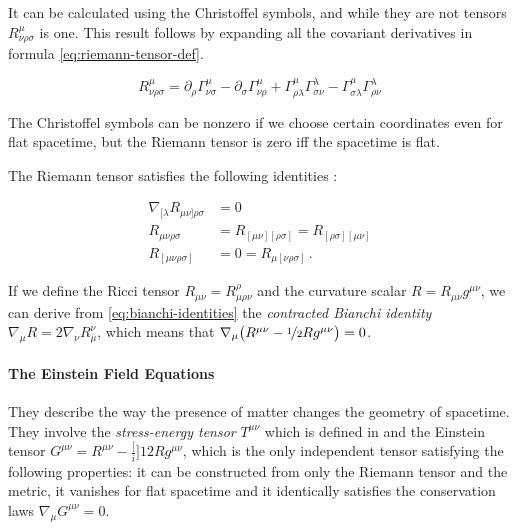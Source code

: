 \documentclass[main.tex]{subfiles}
\begin{document}
It can be calculated using the Christoffel symbols, and while they are not tensors \(R ^{\mu} _{\nu \rho \sigma}\) is one. This result follows by expanding all the covariant derivatives in formula \eqref{eq:riemann-tensor-def}.

\begin{equation}
    R ^{\mu} _{\nu \rho \sigma} =
     \partial_\rho \Gamma^\mu_{\nu \sigma}
    -\partial_\sigma \Gamma^\mu_{\nu \rho}
    +\Gamma^\mu_{\rho \lambda} \Gamma ^{\lambda} _{\sigma \nu}
    -\Gamma^\mu_{\sigma \lambda} \Gamma ^{\lambda} _{\rho \nu}
\end{equation}

The Christoffel symbols can be nonzero if we choose certain coordinates even for flat spacetime, but the Riemann tensor is zero iff the spacetime is flat.

The Riemann tensor satisfies the following identities \cite[eqs. 8.45 and 8.76]{MisnerThorneWheeler:1973}:

\vspace{-.5cm}

\begin{subequations}
\begin{align}
  \nabla _{[\lambda} R_{\mu\nu]\rho \sigma} &= 0 \label{eq:bianchi-identities}  \\
  R_{\mu\nu\rho\sigma} &= R_{[\mu\nu][\rho\sigma]} = R_{[\rho\sigma][\mu\nu]}  \\
  R_{[\mu\nu\rho\sigma]} &= 0 = R_{\mu[\nu\rho\sigma]} \,.
\end{align}
\end{subequations}

If we define the Ricci tensor \(R_{\mu\nu} = R^\rho_{\mu \rho \nu}\) and the curvature scalar \(R = R_{\mu\nu}g^{\mu\nu}\), we can derive from \eqref{eq:bianchi-identities} the \emph{contracted Bianchi identity}  \(\nabla_\mu R = 2 \nabla_\nu R^{\nu}_{\mu}\), which means that \(\nabla_\mu \qty(R^{\mu\nu} - \frac[i]{1}{2} R g^{\mu\nu}) = 0\).

\paragraph{The Einstein Field Equations}

They describe the way the presence of matter changes the geometry of spacetime.
They involve the \emph{stress-energy tensor} \(T^{\mu\nu}\) which is defined in  and the Einstein tensor \(G^{\mu\nu} = R^{\mu\nu} - \frac[i]{1}{2} R g^{\mu\nu}\), which is the only independent tensor satisfying the following properties: it can be constructed from only the Riemann tensor and the metric, it vanishes for flat spacetime and it identically satisfies the conservation laws \(\nabla_\mu G^{\mu\nu} = 0\).
\end{document}
